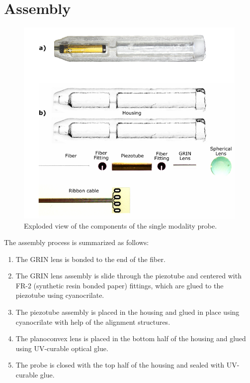 \section{Assembly}
\begin{figure}[h!]\centering \includegraphics{figures/40_Fabrication/Assy/exploded.pdf}
      \caption{Exploded view of the components of the single modality probe.}
      \label{fig:exploded}
\end{figure}
The assembly process is summarized as follows:

\begin{enumerate}
\item The GRIN lens is bonded to the end of the fiber.
\item The GRIN lens assembly is slide through the piezotube and centered with FR-2 (synthetic resin bonded paper) fittings, which are glued to the piezotube using cyanocrilate.
\item The piezotube assembly is placed in the housing and glued in place using cyanocrilate with help of the alignment structures.
\item The planoconvex lens is placed in the bottom half of the housing and glued using UV-curable optical glue.
\item The probe is closed with the top half of the housing and sealed with UV-curable glue.
\end{enumerate}

